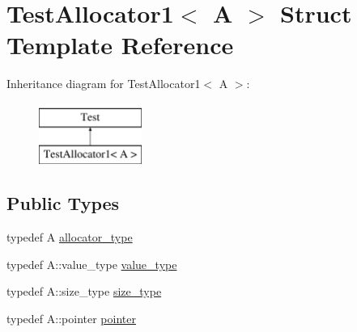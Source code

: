 \hypertarget{structTestAllocator1}{\section{Test\-Allocator1$<$ A $>$ Struct Template Reference}
\label{structTestAllocator1}
}
Inheritance diagram for Test\-Allocator1$<$ A $>$\-:\begin{figure}[H]
\begin{center}
\leavevmode
\includegraphics[height=2.000000cm]{structTestAllocator1}
\end{center}
\end{figure}
\subsection*{Public Types}
\begin{DoxyCompactItemize}
\item 
typedef A \hyperlink{structTestAllocator1_af833c587251c56fda9cc1169d40545d5}{allocator\-\_\-type}
\item 
typedef A\-::value\-\_\-type \hyperlink{structTestAllocator1_a92fce0c8423cac5757d6b1d253d646d5}{value\-\_\-type}
\item 
typedef A\-::size\-\_\-type \hyperlink{structTestAllocator1_aa8c669c72a5405cad2024cb1f2d0213d}{size\-\_\-type}
\item 
typedef A\-::pointer \hyperlink{structTestAllocator1_a2d4b518664da974c318e96f1d5fe8cf5}{pointer}
\end{DoxyCompactItemize}



